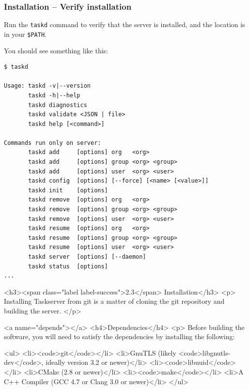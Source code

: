 \documentclass[t,handout]{beamer}
\begin{document}
\begin{frame}[fragile]\frametitle{Installation -- Verify installation}
    Run the \verb+taskd+ command to verify that the server is installed, and the location is in your \verb+$PATH+.

    You should see something like this:

    \begin{lstlisting}
$ taskd

Usage: taskd -v|--version
       taskd -h|--help
       taskd diagnostics
       taskd validate <JSON | file>
       taskd help [<command>]

Commands run only on server:
       taskd add     [options] org   <org>
       taskd add     [options] group <org> <group>
       taskd add     [options] user  <org> <user>
       taskd config  [options] [--force] [<name> [<value>]]
       taskd init    [options]
       taskd remove  [options] org   <org>
       taskd remove  [options] group <org> <group>
       taskd remove  [options] user  <org> <user>
       taskd resume  [options] org   <org>
       taskd resume  [options] group <org> <group>
       taskd resume  [options] user  <org> <user>
       taskd server  [options] [--daemon]
       taskd status  [options]
...
    \end{lstlisting}
%
%
\end{frame}


\iffalse

<h3><span class="label label-success">2.3</span> Installation</h3>
<p>
  Installing Taskserver from git is a matter of cloning the git
  repository and building the server.
</p>

<a name="depends"></a>
<h4>Dependencies</h4>
<p>
  Before building the software, you will need to satisfy the
  dependencies by installing the following:

  <ul>
    <li><code>git</code></li>
    <li>GnuTLS (likely <code>libgnutls-dev</code>, ideally version 3.2 or newer)</li>
    <li><code>libuuid</code></li>
    <li>CMake (2.8 or newer)</li>
    <li><code>make</code></li>
    <li>A C++ Compiler (GCC 4.7 or Clang 3.0 or newer)</li>
  </ul>
\end{document}
